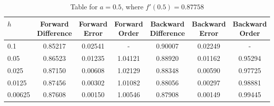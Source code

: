 \begin{table}[H]
\centering
\caption{Table for $a = 0.5$, where $f'(0.5) = 0.87758$}
\begin{tabular}{lcccccc}
\toprule
    $h$ & \makecell{Forward \\ Difference} & \makecell{Forward \\ Error} & \makecell{Forward \\ Order} & \makecell{Backward \\ Difference} & \makecell{Backward \\ Error} & \makecell{Backward \\ Order} \\
\midrule
    0.1 &                          0.85217 &                     0.02541 &                           - &                           0.90007 &                      0.02249 &                            - \\
   0.05 &                          0.86523 &                     0.01235 &                     1.04121 &                           0.88920 &                      0.01162 &                      0.95294 \\
  0.025 &                          0.87150 &                     0.00608 &                     1.02129 &                           0.88348 &                      0.00590 &                      0.97725 \\
 0.0125 &                          0.87456 &                     0.00302 &                     1.01082 &                           0.88056 &                      0.00297 &                      0.98881 \\
0.00625 &                          0.87608 &                     0.00150 &                     1.00546 &                           0.87908 &                      0.00149 &                      0.99445 \\
\bottomrule
\end{tabular}
\end{table}

